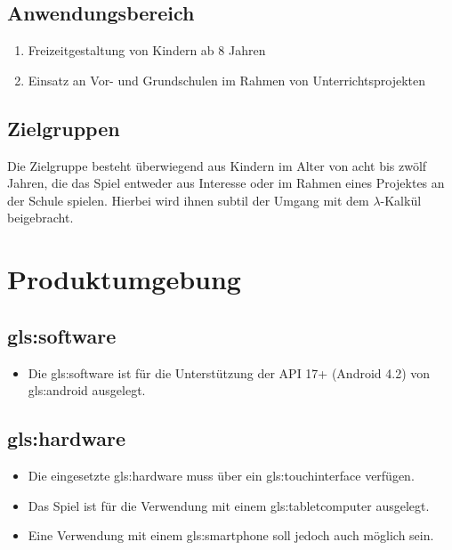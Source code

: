 \documentclass{scrartcl}
\begin{document}
\subsection{Anwendungsbereich}

\begin{enumerate}
	\item Freizeitgestaltung von Kindern ab 8 Jahren
	\item Einsatz an Vor- und Grundschulen im Rahmen von Unterrichtsprojekten
\end{enumerate}

\subsection{Zielgruppen}

Die Zielgruppe besteht überwiegend aus Kindern im Alter von acht bis zwölf Jahren, die das Spiel entweder aus Interesse oder im Rahmen eines Projektes an der Schule spielen. Hierbei wird ihnen subtil der Umgang mit dem $\lambda$-Kalkül beigebracht.

\clearpage








\section{Produktumgebung}

\subsection{\gls{gls:software}}

\begin{itemize}
	\item Die \gls{gls:software} ist für die Unterstützung der API 17+ (Android 4.2) von \gls{gls:android} ausgelegt.
\end{itemize}

\subsection{\gls{gls:hardware}}

\begin{itemize}
	\item Die eingesetzte \gls{gls:hardware} muss über ein \gls{gls:touchinterface} verfügen.
	\item Das Spiel ist für die Verwendung mit einem \gls{gls:tabletcomputer} ausgelegt.
	\item Eine Verwendung mit einem \gls{gls:smartphone} soll jedoch auch möglich sein.
\end{itemize}
\end{document}
